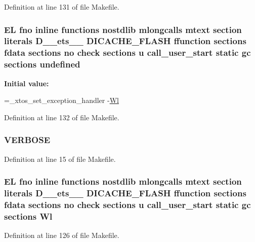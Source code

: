 Definition at line 131 of file Makefile.

\hypertarget{Makefile_a7caa220288c6621dffebfc3a50a851e1}{
\subsubsection[{undefined}]{\setlength{\rightskip}{0pt plus 5cm}E\-L fno inline functions nostdlib mlongcalls mtext section literals D\-\_\-\-\_\-ets\-\_\-\-\_\- D\-I\-C\-A\-C\-H\-E\-\_\-\-F\-L\-A\-S\-H ffunction sections fdata sections no check sections u call\-\_\-user\-\_\-start static gc sections undefined\hspace{0.3cm}{\ttfamily [static]}}}\label{Makefile_a7caa220288c6621dffebfc3a50a851e1}
{\bfseries Initial value\-:}
\begin{DoxyCode}
=\_xtos\_set\_exception\_handler 
    -\hyperlink{Makefile_a1af3a6ecef406b93f1a1db145b2cfd43}{Wl}
\end{DoxyCode}


Definition at line 132 of file Makefile.

\hypertarget{Makefile_a03169c2c7e2ff706233c78422b0daf3a}{
\subsubsection[{V\-E\-R\-B\-O\-S\-E}]{\setlength{\rightskip}{0pt plus 5cm}V\-E\-R\-B\-O\-S\-E}}\label{Makefile_a03169c2c7e2ff706233c78422b0daf3a}


Definition at line 15 of file Makefile.

\hypertarget{Makefile_a1af3a6ecef406b93f1a1db145b2cfd43}{
\subsubsection[{Wl}]{\setlength{\rightskip}{0pt plus 5cm}E\-L fno inline functions nostdlib mlongcalls mtext section literals D\-\_\-\-\_\-ets\-\_\-\-\_\- D\-I\-C\-A\-C\-H\-E\-\_\-\-F\-L\-A\-S\-H ffunction sections fdata sections no check sections u call\-\_\-user\-\_\-start static gc sections Wl}}\label{Makefile_a1af3a6ecef406b93f1a1db145b2cfd43}


Definition at line 126 of file Makefile.

